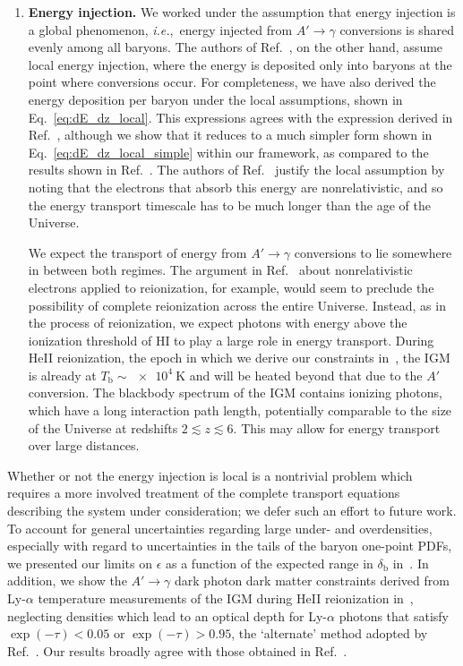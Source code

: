 \documentclass[prd,aps,10pt,nofootinbib,twocolumn,superscriptaddress,preprintnumbers,balancelastpage,longbibliography]{revtex4-1}
\begin{document}
\begin{enumerate}
\item \textbf{Energy injection.} We worked under the assumption that energy injection is a global phenomenon, \emph{i.e.},\ energy injected from $A' \to \gamma$ conversions is shared evenly among all baryons. The authors of Ref.~\cite{Witte:2020rvb}, on the other hand, assume local energy injection, where the energy is deposited only into baryons at the point where conversions occur. 
For completeness, we have also derived the energy deposition per baryon under the local assumptions, shown in Eq.~\eqref{eq:dE_dz_local}. This expressions agrees with the expression derived in Ref.~\cite{Witte:2020rvb}, although we show that it reduces to a much simpler form shown in Eq.~\eqref{eq:dE_dz_local_simple} within our framework, as compared to the results shown in Ref.~\cite{Witte:2020rvb}. 
The authors of Ref.~\cite{Witte:2020rvb} justify the local assumption by noting that the electrons that absorb this energy are nonrelativistic, and so the energy transport timescale has to be much longer than the age of the Universe. 

We expect the transport of energy from $A' \to \gamma$ conversions to lie somewhere in between both regimes.
The argument in Ref.~\cite{Witte:2020rvb} about nonrelativistic electrons applied to reionization, for example, would seem to preclude the possibility of complete reionization across the entire Universe. 
Instead, as in the process of reionization, we expect photons with energy above the ionization threshold of HI to play a large role in energy transport. 
During HeII reionization, the epoch in which we derive our constraints in~, the IGM is already at $T_\text{b} \sim \SI{e4}{\kelvin} $ and will be heated beyond that due to the $A'$ conversion. 
The blackbody spectrum of the IGM contains ionizing photons, which have a long interaction path length, potentially comparable to the size of the Universe at redshifts $2 \lesssim z \lesssim 6$. This may allow for energy transport over large distances. 

\end{enumerate}

Whether or not the energy injection is local is a nontrivial problem which requires a more involved treatment of the complete transport equations describing the system under consideration; we defer such an effort to future work. 
To account for general uncertainties regarding large under- and overdensities, especially with regard to uncertainties in the tails of the baryon one-point PDFs, we presented our limits on $\epsilon$ as a function of the expected range in $\delta_\text{b}$ in~.
In addition, we show the $A' \to \gamma$ dark photon dark matter constraints derived from Ly-$\alpha$ temperature measurements of the IGM during HeII reionization in~, neglecting densities which lead to an optical depth for Ly-$\alpha$ photons that satisfy $\exp(-\tau) < 0.05$ or $\exp(-\tau) > 0.95$, the `alternate' method adopted by Ref.~\cite{Witte:2020rvb}. 
Our results broadly agree with those obtained in Ref.~\cite{Witte:2020rvb}. 
\end{document}
